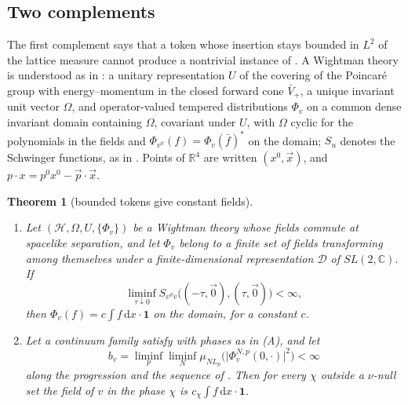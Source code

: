 \documentclass[11pt,a4paper]{amsart}
\newtheorem{theorem}{Theorem}[section]
\theoremstyle{definition}
\theoremstyle{remark}
\numberwithin{equation}{section}
\newcommand{\R}{\mathbb{R}}          %
\newcommand{\C}{\mathbb{C}}          %
\newcommand{\Hilb}{\mathcal{H}}      %
\newcommand{\abs}[1]{\lvert #1\rvert}      %
\newcommand{\dd}{\,\mathrm{d}}             %
\newcommand{\hypW}{\text{\upshape(W)}}              %
\newcommand{\Lp}{L_p}                      %
\begin{document}
\subsection{Two complements}

The first complement says that a token whose insertion stays bounded in $L^2$ of the lattice measure cannot produce a nontrivial instance of \hypW. A Wightman theory is understood as in \cite[Section~7.5]{bhattacharjee2026first}: a unitary representation $U$ of the covering of the Poincar\'e group with energy--momentum in the closed forward cone $\bar V_+$, a unique invariant unit vector $\Omega$, and operator-valued tempered distributions $\Phi_v$ on a common dense invariant domain containing $\Omega$, covariant under $U$, with $\Omega$ cyclic for the polynomials in the fields and $\Phi_{v^\vartheta}(f)=\Phi_v(\bar f)^*$ on the domain; $S_{u}$ denotes the Schwinger functions, as in \cite[Lemma~13]{bhattacharjee2026first}. Points of $\R^4$ are written $(x^0,\vec x)$, and $p\cdot x=p^0x^0-\vec p\cdot\vec x$.

\begin{theorem}[bounded tokens give constant fields]\label{thm:bounded-tokens}
\begin{enumerate}[label=(\Alph*),leftmargin=2.2em]
\item Let $(\Hilb,\Omega,U,\{\Phi_v\})$ be a Wightman theory whose fields commute at spacelike separation, and let $\Phi_v$ belong to a finite set of fields transforming among themselves under a finite-dimensional representation $\mathcal D$ of $SL(2,\C)$. If
\[
\liminf_{\tau\downarrow0}S_{v^\vartheta v}\bigl((-\tau,\vec0),(\tau,\vec0)\bigr)<\infty,
\]
then $\Phi_v(f)=c\int f\dd x\cdot\mathbf 1$ on the domain, for a constant $c$.
\item Let a continuum family satisfy \hypW{} with phases as in \textup{(A)}, and let
\[
b_v=\liminf_p\liminf_N\mu_{N\Lp}\bigl(\abs{\Phi^{N,p}_v(0,\cdot)}^2\bigr)<\infty
\]
along the progression and the sequence of \hypW. Then for every $\chi$ outside a $\nu$-null set the field of $v$ in the phase $\chi$ is $c_\chi\int f\dd x\cdot\mathbf 1$.
\end{enumerate}
\end{theorem}
\end{document}
